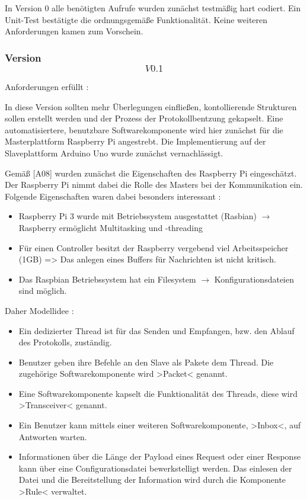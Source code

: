 %

In Version 0 alle benötigten Aufrufe wurden zunächst testmäßig hart codiert.
Ein Unit-Test bestätigte die ordnungsgemäße Funktionalität.
Keine weiteren Anforderungen kamen zum Vorschein.

\subsubsection{Version \[V0.1\]}

Anforderungen erfüllt : 

In diese Version sollten mehr Überlegungen einfließen, kontollierende Strukturen sollen erstellt werden und der Prozess der Protokollbentzung gekapselt.
Eine automatisiertere, benutzbare Softwarekomponente wird hier zunächst für die Masterplattform Raspberry Pi angestrebt.
Die Implementierung auf der Slaveplattform Arduino Uno wurde zunächst vernachlässigt.

Gemäß [A08] wurden zunächst die Eigenschaften des Raspberry Pi eingeschätzt. Der Raspberry Pi nimmt dabei die Rolle des Masters bei der Kommunikation ein.
Folgende Eigenschaften waren dabei besonders interessant :

\begin{itemize}
	\item Raspberry Pi 3 wurde mit Betriebssystem ausgestattet (Rasbian) $ \rightarrow $ Raspberry ermöglicht Multitasking und -threading
	\item Für einen Controller besitzt der Raspberry vergebend viel Arbeitsspeicher (1GB) => Das anlegen eines Buffers für Nachrichten ist nicht kritisch.
	\item Das Raspbian Betriebssystem hat ein Filesystem $\rightarrow$ Konfigurationsdateien sind möglich.
\end{itemize}

Daher Modellidee :
\begin{itemize}
	\item Ein dedizierter Thread ist für das Senden und Empfangen, bzw. den Ablauf des Protokolls, zuständig.
	\item Benutzer geben ihre Befehle an den Slave als Pakete dem Thread. Die zugehörige Softwarekomponente wird >Packet< genannt.
	\item Eine Softwarekomponente kapselt die Funktionalität des Threads, diese wird >Transceiver< genannt.
	\item Ein Benutzer kann mittels einer weiteren Softwarekomponente, >Inbox<, auf Antworten warten.
	\item Informationen über die Länge der Payload eines Request oder einer Response kann über eine Configurationsdatei bewerkstelligt werden. Das einlesen der Datei und die Bereitstellung der Information wird durch die Komponente >Rule< verwaltet.
\end{itemize}

